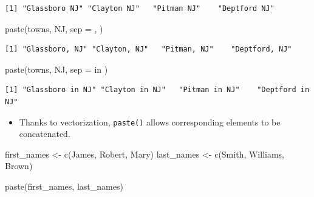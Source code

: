 \documentclass[
  letterpaper,
  DIV=11,
  numbers=noendperiod]{scrreprt}
\newenvironment{Shaded}{\begin{snugshade}}{\end{snugshade}}
\newcommand{\AttributeTok}[1]{\textcolor[rgb]{0.40,0.45,0.13}{#1}}
\newcommand{\FunctionTok}[1]{\textcolor[rgb]{0.28,0.35,0.67}{#1}}
\newcommand{\NormalTok}[1]{\textcolor[rgb]{0.00,0.23,0.31}{#1}}
\newcommand{\OtherTok}[1]{\textcolor[rgb]{0.00,0.23,0.31}{#1}}
\newcommand{\StringTok}[1]{\textcolor[rgb]{0.13,0.47,0.30}{#1}}
\providecommand{\tightlist}{%
  \setlength{\itemsep}{0pt}\setlength{\parskip}{0pt}}\usepackage{longtable,booktabs,array}
\begin{document}
\begin{verbatim}
[1] "Glassboro NJ" "Clayton NJ"   "Pitman NJ"    "Deptford NJ" 
\end{verbatim}

\begin{Shaded}
\begin{Highlighting}[]
\FunctionTok{paste}\NormalTok{(towns, }\StringTok{\textquotesingle{}NJ\textquotesingle{}}\NormalTok{, }\AttributeTok{sep =} \StringTok{\textquotesingle{}, \textquotesingle{}}\NormalTok{)}
\end{Highlighting}
\end{Shaded}

\begin{verbatim}
[1] "Glassboro, NJ" "Clayton, NJ"   "Pitman, NJ"    "Deptford, NJ" 
\end{verbatim}

\begin{Shaded}
\begin{Highlighting}[]
\FunctionTok{paste}\NormalTok{(towns, }\StringTok{\textquotesingle{}NJ\textquotesingle{}}\NormalTok{, }\AttributeTok{sep =} \StringTok{\textquotesingle{} in \textquotesingle{}}\NormalTok{)}
\end{Highlighting}
\end{Shaded}

\begin{verbatim}
[1] "Glassboro in NJ" "Clayton in NJ"   "Pitman in NJ"    "Deptford in NJ" 
\end{verbatim}

\begin{itemize}
\tightlist
\item
  Thanks to vectorization, \texttt{paste()} allows corresponding
  elements to be concatenated.
\end{itemize}

\begin{Shaded}
\begin{Highlighting}[]
\NormalTok{first\_names }\OtherTok{\textless{}{-}} \FunctionTok{c}\NormalTok{(}\StringTok{\textquotesingle{}James\textquotesingle{}}\NormalTok{, }\StringTok{\textquotesingle{}Robert\textquotesingle{}}\NormalTok{, }\StringTok{\textquotesingle{}Mary\textquotesingle{}}\NormalTok{)}
\NormalTok{last\_names  }\OtherTok{\textless{}{-}} \FunctionTok{c}\NormalTok{(}\StringTok{\textquotesingle{}Smith\textquotesingle{}}\NormalTok{, }\StringTok{\textquotesingle{}Williams\textquotesingle{}}\NormalTok{, }\StringTok{\textquotesingle{}Brown\textquotesingle{}}\NormalTok{)}

\FunctionTok{paste}\NormalTok{(first\_names, last\_names)}
\end{Highlighting}
\end{Shaded}
\end{document}
